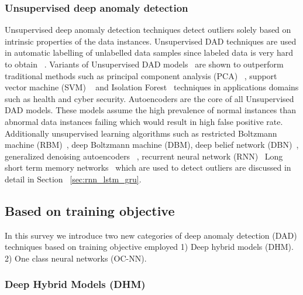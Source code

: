 \subsubsection{Unsupervised deep anomaly detection}
\label{sec:USAD}

Unsupervised deep anomaly detection techniques detect outliers solely based on intrinsic properties of the data instances. Unsupervised DAD techniques are used in automatic labelling of unlabelled data samples since labeled data is very hard to obtain ~\cite{patterson2017deep}. Variants of Unsupervised DAD models~\cite{tuor2017deep} are shown to outperform traditional methods such as principal component analysis (PCA) ~\cite{wold1987principal}, support vector machine (SVM) ~\cite{cortes1995support} and Isolation Forest~\cite{liu2008isolation} techniques in applications domains such as health and cyber security.
Autoencoders are the core of all Unsupervised DAD models. These models assume the high prevalence of normal instances than abnormal data instances failing which would result in high false positive rate. Additionally unsupervised learning algorithms such as restricted Boltzmann machine (RBM)~\cite{sutskever2009recurrent}, deep Boltzmann machine (DBM), deep belief network (DBN)~\cite{salakhutdinov2010efficient}, generalized denoising autoencoders~\cite{vincent2008extracting} , recurrent neural network (RNN)~\cite{rodriguez1999recurrent} Long short term memory networks~\cite{lample2016neural} which are used to detect outliers are discussed in detail in Section ~\ref{sec:rnn_lstm_gru}.

\subsection{Based on training objective}
In this survey we introduce two new categories of deep anomaly detection (DAD) techniques based on training objective employed 1) Deep hybrid models (DHM). 2) One class neural networks (OC-NN).

\subsubsection{Deep Hybrid Models (DHM)}
\label{sec:DHM}

